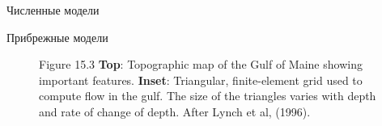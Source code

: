 \begin{chapter}{Численные модели}
\begin{section}{Прибрежные модели}
\begin{figure}[t!]
\caption{Figure 15.3 \textbf{Top}: Topographic map of the Gulf of
Maine showing important features. \textbf{Inset}: Triangular,
finite-element grid used to compute flow in the gulf. The size of the
triangles varies with depth and rate of change of depth. After Lynch
et al, (1996).}
\label{fig:GulfofMaine}
\end{figure}
%


\end{section}
\end{chapter}
